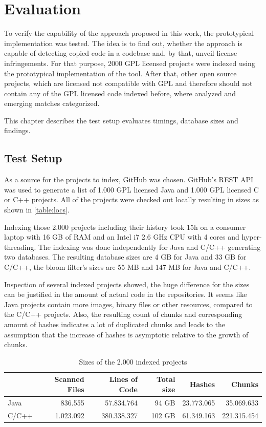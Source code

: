
\chapter{Evaluation}\label{chapter:evaluation}
To verify the capability of the approach proposed in this work, the prototypical implementation was tested.
The idea is to find out, whether the approach is capable of detecting copied code in a codebase and, by that, unveil license infringements.
For that purpose, 2000 GPL licensed projects were indexed using the prototypical implementation of the tool.
After that, other open source projects, which are licensed not compatible with GPL and therefore should not contain any of the GPL licensed code indexed before, where analyzed and emerging matches categorized.

This chapter describes the test setup evaluates timings, database sizes and findings.

\section{Test Setup}\label{section:evaluation/test_setup}
As a source for the projects to index, GitHub was chosen.
GitHub's REST API was used to generate a list of 1.000 GPL licensed Java and 1.000 GPL licensed C or C++ projects.
All of the projects were checked out locally resulting in sizes as shown in \autoref{table:locs}.

Indexing those 2.000 projects including their history took 15h on a consumer laptop with 16 GB of RAM and an Intel i7 2.6 GHz CPU with 4 cores and hyper-threading.
The indexing was done independently for Java and C/C++ generating two databases.
The resulting database sizes are 4 GB for Java and 33 GB for C/C++, the bloom filter's sizes are 55 MB and 147 MB for Java and C/C++.

Inspection of several indexed projects showed, the huge difference for the sizes can be justified in the amount of actual code in the repositories.
It seems like Java projects contain more images, binary files or other resources, compared to the C/C++ projects.
Also, the resulting count of chunks and corresponding amount of hashes indicates a lot of duplicated chunks and leads to the assumption that the increase of hashes is asymptotic relative to the growth of chunks.

\begin{table}[ht]
	\centering
	\begin{tabular}{l|rrrrr}
		& \textbf{Scanned Files} & \textbf{Lines of Code} & \textbf{Total size} & \textbf{Hashes} & \textbf{Chunks} \\ 
		\hline 
		Java & 836.555 & 57.834.764 & 94 GB & 23.773.065 & 35.069.633 \\
		C/C++ & 1.023.092 & 380.338.327 & 102 GB & 61.349.163 & 221.315.454 \\ 
	\end{tabular}
	\caption{Sizes of the 2.000 indexed projects}\label{table:locs}
\end{table}

